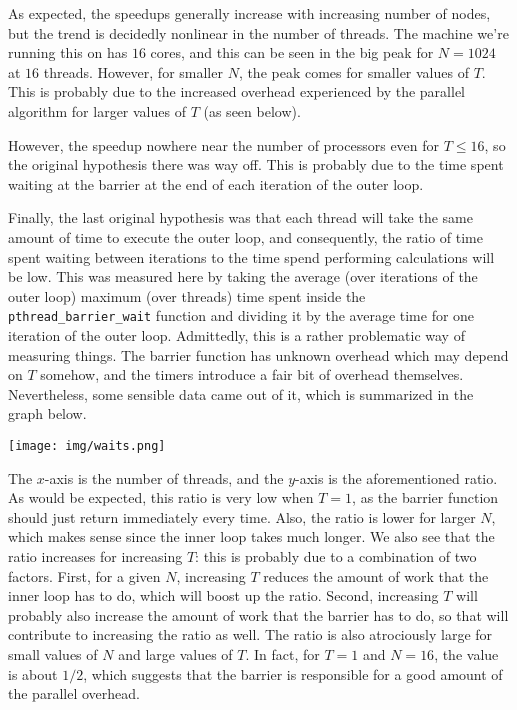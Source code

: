 \documentclass{article}
\begin{document}
As expected, the speedups generally increase with increasing number of nodes, but the trend is decidedly nonlinear in the number of threads. The machine we're running this on has $16$ cores, and this can be seen in the big peak for $N=1024$ at $16$ threads. However, for smaller $N$, the peak comes for smaller values of $T$. This is probably due to the increased overhead experienced by the parallel algorithm for larger values of $T$ (as seen below). 

However, the speedup nowhere near the number of processors even for $T\leq16$, so the original hypothesis there was way off. This is probably due to the time spent waiting at the barrier at the end of each iteration of the outer loop.

Finally, the last original hypothesis was that each thread will take the same amount of time to execute the outer loop, and consequently, the ratio of time spent waiting between iterations to the time spend performing calculations will be low. This was measured here by taking the average (over iterations of the outer loop) maximum (over threads) time spent inside the \verb|pthread_barrier_wait| function and dividing it by the average time for one iteration of the outer loop. 
Admittedly, this is a rather problematic way of measuring things. The barrier function has unknown overhead which may depend on $T$ somehow, and the timers introduce a fair bit of overhead themselves. Nevertheless, some sensible data came out of it, which is summarized in the graph below.

\texttt{[image: img/waits.png]}

The $x$-axis is the number of threads, and the $y$-axis is the aforementioned ratio. As would be expected, this ratio is very low when $T=1$, as the barrier function should just return immediately every time. Also, the ratio is lower for larger $N$, which makes sense since the inner loop takes much longer. We also see that the ratio increases for increasing $T$: this is probably due to a combination of two factors. First, for a given $N$, increasing $T$ reduces the amount of work that the inner loop has to do, which will boost up the ratio. Second, increasing $T$ will probably also increase the amount of work that the barrier has to do, so that will contribute to increasing the ratio as well.
The ratio is also atrociously large for small values of $N$ and large values of $T$. In fact, for $T=1$ and $N=16$, the value is about $1/2$, which suggests that the barrier is responsible for a good amount of the parallel overhead.
\end{document}
